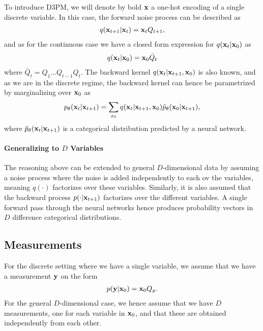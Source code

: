 To introduce D3PM, we will denote by bold $\mathbf{x}$ a one-hot encoding of a single discrete variable. In this case, the forward noise process can be described as
\begin{align}
    q(\mathbf{x}_{t+1}|\mathbf{x}_{t}) = \mathbf{x}_{t} Q_{t+1},
\end{align}
and as for the continuous case we have a closed form expression for $q(\mathbf{x}_{t}|\mathbf{x}_0)$ as
\begin{align}
    q(\mathbf{x}_{t}|\mathbf{x}_0) = \mathbf{x}_0 \bar Q_{t}
\end{align}
where $\bar Q_t = Q_1\hdots Q_{t-1} Q_t$. The backward kernel $q(\mathbf{x}_{t}|\mathbf{x}_{t+1}, \mathbf{x}_0)$ is also known, and as we are in the discrete regime, the backward kernel can hence be parametrized by marginalizing over $\mathbf{x}_0$ as
\begin{align}
    p_\theta(\mathbf{x}_{t}|\mathbf{x}_{t+1}) = \sum_{x_0} q(\mathbf{x}_{t}|\mathbf{x}_{t+1}, \mathbf{x}_0)\tilde p_\theta(\mathbf{x}_0|\mathbf{x}_{t+1}),
\end{align}
where $\tilde p_\theta(\mathbf{x}_{t}|\mathbf{x}_{t+1})$ is a categorical distribution predicted by a neural network. 

\paragraph{Generalizing to $D$ Variables}
The reasoning above can be extended to general $D$-dimensional data by assuming a noise process where the noise is added independently to each ov the variables, meaning $q(\cdot)$ factorizes over these variables. Similarly, it is also assumed that the backward process $p(\cdot|\mathbf{x}_{t+1})$ factorizes over the different variables. A single forward pass through the neural networks hence produces probability vectors in $D$ difference categorical distributions.

\subsection{Measurements}
For the discrete setting where we have a single variable, we assume that we have a measurement $\mathbf{y}$ on the form
\begin{align}
    p(\mathbf{y}|\mathbf{x}_0) = \mathbf{x}_0 Q_y. \label{eq:discrete_measurement_model}
\end{align}
For the general $D$-dimensional case, we hence assume that we have $D$ measurements, one for each variable in $\mathbf{x}_0$, and that these are obtained independently from each other. 

